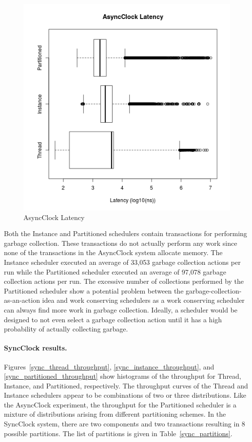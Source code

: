 \begin{figure}
\center
\includegraphics[height=.4\textheight]{async_latency_box.png}
\caption{AsyncClock Latency}
\label{async_latency_box}
\end{figure}

Both the Instance and Partitioned schedulers contain transactions for performing garbage collection.
These transactions do not actually perform any work since none of the transactions in the AsyncClock system allocate memory.
The Instance scheduler executed an average of 33,053 garbage collection actions per run while the Partitioned scheduler executed an average of 97,078 garbage collection actions per run.
The excessive number of collections performed by the Partitioned scheduler show a potential problem between the garbage-collection-as-an-action idea and work conserving schedulers as a work conserving scheduler can always find more work in garbage collection.
Ideally, a scheduler would be designed to not even select a garbage collection action until it has a high probability of actually collecting garbage.

\clearpage

\paragraph{SyncClock results.}
Figures~\ref{sync_thread_throughput}, \ref{sync_instance_throughput}, and \ref{sync_partitioned_throughput} show histograms of the throughput for Thread, Instance, and Partitioned, respectively.
The throughput curves of the Thread and Instance schedulers appear to be combinations of two or three distributions.
Like the AsyncClock experiment, the throughput for the Partitioned scheduler is a mixture of distributions arising from different partitioning schemes.
In the SyncClock system, there are two components and two transactions resulting in 8 possible partitions.
The list of partitions is given in Table~\ref{sync_partitions}.

